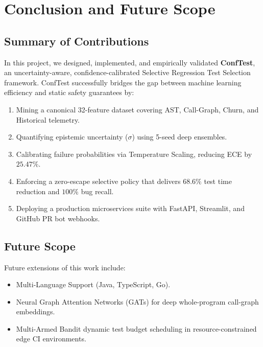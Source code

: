 \chapter{Conclusion and Future Scope}

\section{Summary of Contributions}
In this project, we designed, implemented, and empirically validated \textbf{ConfTest}, an uncertainty-aware, confidence-calibrated Selective Regression Test Selection framework. ConfTest successfully bridges the gap between machine learning efficiency and static safety guarantees by:
\begin{enumerate}
    \item Mining a canonical 32-feature dataset covering AST, Call-Graph, Churn, and Historical telemetry.
    \item Quantifying epistemic uncertainty ($\sigma$) using 5-seed deep ensembles.
    \item Calibrating failure probabilities via Temperature Scaling, reducing ECE by $25.47\%$.
    \item Enforcing a zero-escape selective policy that delivers $68.6\%$ test time reduction and $100\%$ bug recall.
    \item Deploying a production microservices suite with FastAPI, Streamlit, and GitHub PR bot webhooks.
\end{enumerate}

\section{Future Scope}
Future extensions of this work include:
\begin{itemize}
    \item Multi-Language Support (Java, TypeScript, Go).
    \item Neural Graph Attention Networks (GATs) for deep whole-program call-graph embeddings.
    \item Multi-Armed Bandit dynamic test budget scheduling in resource-constrained edge CI environments.
\end{itemize}
